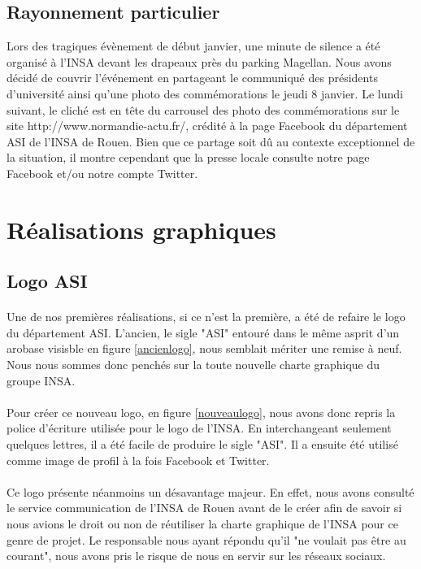 \subsection{Rayonnement particulier}

Lors des tragiques évènement de début janvier, une minute de silence a été organisé à l'INSA devant les drapeaux près du parking Magellan. Nous avons décidé de couvrir l'événement en partageant le communiqué des présidents d'université ainsi qu'une photo des commémorations le jeudi 8 janvier. 
Le lundi suivant, le cliché est en tête du carrousel des photo des commémorations sur le site http://www.normandie-actu.fr/, crédité à la page Facebook du département ASI de l'INSA de Rouen.
Bien que ce partage soit dû au contexte exceptionnel de la situation, il montre cependant que la presse locale consulte notre page Facebook et/ou notre compte Twitter.

\section{Réalisations graphiques}
	\subsection{Logo ASI}

		\paragraph{}
		Une de nos premières réalisations, si ce n'est la première, a été de refaire le logo du département ASI. L'ancien, le sigle "ASI" entouré dans le même asprit d'un arobase visisble en figure \ref{ancienlogo}, 
		nous semblait mériter une remise à neuf. Nous nous sommes donc penchés sur la toute nouvelle charte graphique du groupe INSA. 
		
		\paragraph{}
		Pour créer ce nouveau logo, en figure \ref{nouveaulogo}, nous avons donc repris la police d'écriture utilisée pour le logo de l'INSA. En interchangeant seulement quelques lettres, il a été facile de 
		produire le sigle "ASI". Il a ensuite été utilisé comme image de profil à la fois Facebook et Twitter.
		
		\paragraph{}
		Ce logo présente néanmoins un désavantage majeur. En effet, nous avons consulté le service communication de l'INSA de Rouen avant de le créer afin de savoir si nous avions le droit ou non de réutiliser la charte 
		graphique de l'INSA pour ce genre de projet. Le responsable nous ayant répondu qu'il "ne voulait pas être au courant", nous avons pris le risque de nous en servir sur les réseaux sociaux. 
		
